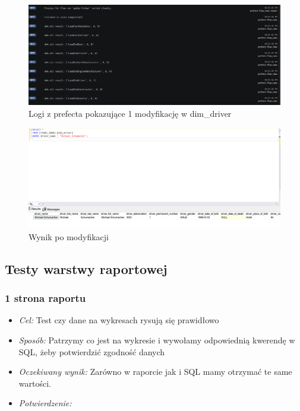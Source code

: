 \documentclass[12pt]{article}
\begin{document}
\begin{figure}[H]
    \centering   \includegraphics[width=\textwidth]{test20.png}
    \caption{Logi z prefecta pokazujące 1 modyfikację w dim\_driver}
\end{figure}

\begin{figure}[H]
    \centering   \includegraphics[width=\textwidth]{test21.png}
    \caption{Wynik po modyfikacji}
\end{figure}

\subsection{Testy warstwy raportowej}
\subsubsection*{1 strona raportu}
\begin{itemize}
    \item \textit{Cel:} Test czy dane na wykresach rysują się prawidłowo
    \item \textit{Sposób:}
   Patrzymy co jest na wykresie i wywołamy odpowiednią kwerendę w SQL, żeby potwierdzić zgodność danych
     \item \textit{Oczekiwany wynik:}
     Zarówno w raporcie jak i SQL mamy otrzymać te same wartości.
      \item \textit{Potwierdzenie:}
\end{itemize}
\end{document}
